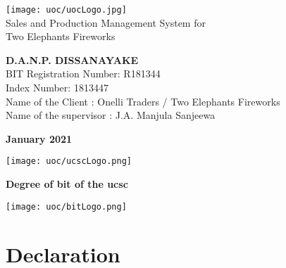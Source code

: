 \documentclass[12pt]{report}
\begin{document}
\onehalfspacing

\setlength{\parindent}{3em} %
\setlength{\parskip}{1em} %

\thispagestyle{empty}
\begin{titlepage}
	\begin{center}
		\vspace*{2cm}
		\texttt{[image: uoc/uocLogo.jpg]}\\
		\vspace{1cm}
		{\LARGE Sales and Production Management System for \\Two Elephants Fireworks}
		\vspace{2cm}
		\begin{large}

			\textbf{D.A.N.P. DISSANAYAKE}\\
			\vspace{2cm}
			BIT Registration Number: R181344 \\
			Index Number: 1813447 \\
			Name of the Client :  Onelli Traders / Two Elephants Fireworks \\
			Name of the supervisor :  J.A. Manjula Sanjeewa \\

			\vspace{1cm}

			\bf{January 2021}

			\vspace{2.5cm}

			\vfill


			\texttt{[image: uoc/ucscLogo.png]}%
			\begin{minipage}[b]{0.7\textwidth}
				\centering
				{\small \bf Degree of \acrlong{bit} of the \acrlong{ucsc}}
			\end{minipage}%
			\texttt{[image: uoc/bitLogo.png]}
		\end{large}
	\end{center}
\end{titlepage}

\newpage
\thispagestyle{plain}
\setcounter{page}{2}
\chapter*{\Huge Declaration}
\end{document}
